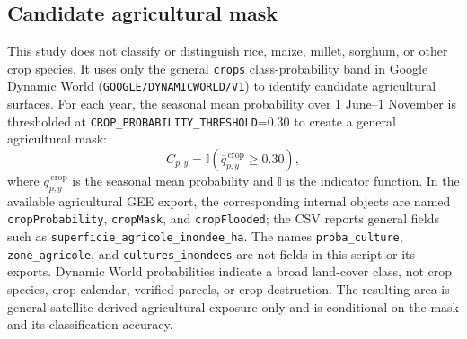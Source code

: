 \documentclass[pdflatex,sn-mathphys,Numbered]{sn-jnl}
\begin{document}
\subsection{Candidate agricultural mask}
This study does not classify or distinguish rice, maize, millet, sorghum, or other crop species. It uses only the general \texttt{crops} class-probability band in Google Dynamic World (\texttt{GOOGLE/DYNAMICWORLD/V1}) to identify candidate agricultural surfaces. For each year, the seasonal mean probability over 1 June--1 November is thresholded at \texttt{CROP\_PROBABILITY\_THRESHOLD}=0.30 to create a general agricultural mask:
\begin{equation}
C_{p,y}=\mathbb{I}\left(\overline{q}^{\,\mathrm{crop}}_{p,y}\geq0.30\right),
\end{equation}
where $\overline{q}^{\,\mathrm{crop}}_{p,y}$ is the seasonal mean probability and $\mathbb{I}$ is the indicator function. In the available agricultural GEE export, the corresponding internal objects are named \texttt{cropProbability}, \texttt{cropMask}, and \texttt{cropFlooded}; the CSV reports general fields such as \texttt{superficie\_agricole\_inondee\_ha}. The names \texttt{proba\_culture}, \texttt{zone\_agricole}, and \texttt{cultures\_inondees} are not fields in this script or its exports. Dynamic World probabilities indicate a broad land-cover class, not crop species, crop calendar, verified parcels, or crop destruction. The resulting area is general satellite-derived agricultural exposure only and is conditional on the mask and its classification accuracy.
\end{document}
